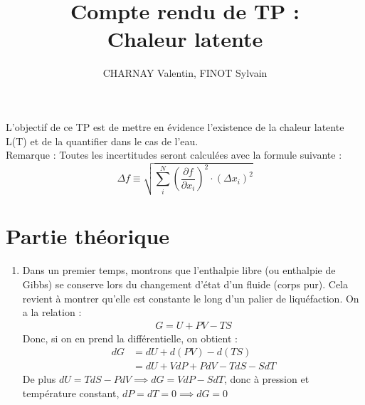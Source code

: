 \documentclass[12pt,a4paper]{article}
\author{CHARNAY Valentin, FINOT Sylvain}
\title{Compte rendu de TP : \\ Chaleur latente}
\begin{document}
\maketitle
L'objectif de ce TP est de mettre en évidence l'existence de la chaleur latente L(T) et de la quantifier dans le cas de l'eau.\\
Remarque : Toutes les incertitudes seront calculées avec la formule suivante : \\
$$\boxed{\Delta f \equiv \sqrt {\sum _{i}^{N}\left( \dfrac {\partial f} {\partial x_{i}}\right) ^{2}\cdot (\Delta x_i)^{2}}}$$
\section{Partie théorique}
\begin{enumerate}
\item Dans un premier temps, montrons que l'enthalpie libre (ou enthalpie de Gibbs) se conserve lors du changement d'état d'un fluide (corps pur). Cela revient à montrer qu'elle est constante le long d'un palier de liquéfaction. On a la relation :
\begin{align}
G = U + PV - TS
\end{align}
Donc, si on en prend la différentielle, on obtient : 
\begin{align*}
dG &= dU + d(PV) - d(TS)\\
&=dU + VdP + PdV - TdS - SdT 
\end{align*}
De plus $dU = TdS - PdV \implies dG=VdP-SdT$, donc à pression et température constant, $dP=dT=0 \implies dG=0$


\end{enumerate}
\end{document}
